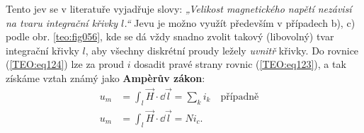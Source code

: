         Tento jev se v literatuře vyjadřuje slovy: \emph{„Velikost magnetického napětí nezávisí na
        tvaru integrační křivky \(l\).“} Jevu je možno využít především v případech b), c) podle
        obr. \ref{teo:fig056}, kde se dá vždy snadno zvolit takový (libovolný) tvar integrační
        křivky \(l\), aby všechny diskrétní proudy ležely \emph{uvnitř} křivky. Do rovnice
        (\ref{TEO:eq124}) lze za proud \(i\) dosadit pravé strany rovnic (\ref{TEO:eq123}), a tak
        získáme vztah známý jako \textbf{Ampèrův zákon}:
        \begin{align*}
          u_m &= \int_l \vec{H}\cdot \dd{\vec{l}} =\sum_k i_k 
          \quad\text{případně}\quad                                 \\
          u_m &= \int_l \vec{H}\cdot \dd{\vec{l}} =Ni_c.           
        \end{align*}
     
